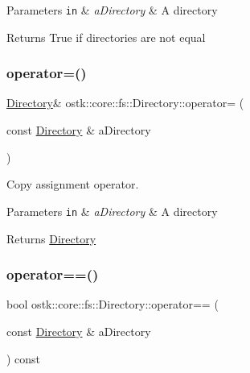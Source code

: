 \begin{DoxyParams}[1]{Parameters}
\mbox{\tt in}  & {\em a\+Directory} & A directory \\
\hline
\end{DoxyParams}
\begin{DoxyReturn}{Returns}
True if directories are not equal 
\end{DoxyReturn}
\mbox{\label{classostk_1_1core_1_1fs_1_1_directory_a0394d54286d7c64268d53959ee7edd08}} 
\subsubsection{\texorpdfstring{operator=()}{operator=()}}
{\footnotesize\ttfamily \hyperlink{classostk_1_1core_1_1fs_1_1_directory}{Directory}\& ostk\+::core\+::fs\+::\+Directory\+::operator= (\begin{DoxyParamCaption}\item[{const \hyperlink{classostk_1_1core_1_1fs_1_1_directory}{Directory} \&}]{a\+Directory }\end{DoxyParamCaption})\hspace{0.3cm}{\ttfamily [default]}}



Copy assignment operator. 


\begin{DoxyParams}[1]{Parameters}
\mbox{\tt in}  & {\em a\+Directory} & A directory \\
\hline
\end{DoxyParams}
\begin{DoxyReturn}{Returns}
\hyperlink{classostk_1_1core_1_1fs_1_1_directory}{Directory} 
\end{DoxyReturn}
\mbox{\label{classostk_1_1core_1_1fs_1_1_directory_a54b143a61f84ae2104b5829ec48ab560}} 
\subsubsection{\texorpdfstring{operator==()}{operator==()}}
{\footnotesize\ttfamily bool ostk\+::core\+::fs\+::\+Directory\+::operator== (\begin{DoxyParamCaption}\item[{const \hyperlink{classostk_1_1core_1_1fs_1_1_directory}{Directory} \&}]{a\+Directory }\end{DoxyParamCaption}) const}



